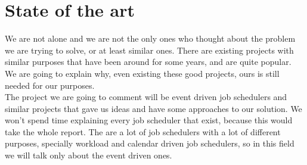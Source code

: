 \section{State of the art}
We are not alone and we are not the only ones who thought about the problem we are trying to solve, or at least similar ones. There are
existing projects with similar purposes that have been around for some years, and are quite popular. We are going to explain why, even 
existing these good projects, ours is still needed for our purposes.\\
The project we are going to comment will be event driven job schedulers and similar projects that gave us ideas and have some approaches
to our solution. We won't spend time explaining every job scheduler that exist, because this would take the whole report. The are a lot 
of job schedulers with a lot of different purposes, specially workload and calendar driven job schedulers, so in this field we will talk 
only about the event driven ones.
